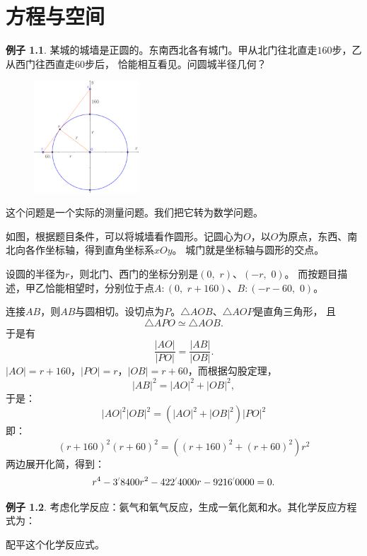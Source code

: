 \documentclass[12pt,UTF8]{ctexbook}
\newcommand{\dlim}[1]{^{\color{gray}\prime}#1}
\theoremstyle{definition}
\newtheorem{ex}{例子}[section]
\theoremstyle{plain}
\begin{document}
\chapter{方程与空间}

\begin{ex}
    某城的城墙是正圆的。东南西北各有城门。甲从北门往北直走$160$步，乙从西门往西直走$60$步后，
    恰能相互看见。问圆城半径几何？ %
\end{ex}

\begin{figure} %
    \vspace{-30pt}
    \flushright
    \includegraphics[width=0.35\textwidth]{tu/整式方程1.png}
\end{figure}

这个问题是一个实际的测量问题。我们把它转为数学问题。

如图，根据题目条件，可以将城墙看作圆形。记圆心为$O$，以$O$为原点，东西、南北向各作坐标轴，得到直角坐标系$xOy$。
城门就是坐标轴与圆形的交点。

设圆的半径为$r$，则北门、西门的坐标分别是$(0, \,\, r)$、$(-r, \,\, 0)$。
而按题目描述，甲乙恰能相望时，分别位于点$A:(0, \,\, r+160)$、$B:(-r-60, \,\, 0)$。

连接$AB$，则$AB$与圆相切。设切点为$P$。$\triangle AOB$、$\triangle AOP$是直角三角形，
且
$$ \triangle APO \simeq \triangle AOB.$$
于是有
$$ \frac{|AO|}{|PO|} = \frac{|AB|}{|OB|}.$$
$|AO| = r+160$，$|PO| = r$，$|OB| = r + 60$，而根据勾股定理，
$$ |AB|^2 = |AO|^2 + |OB|^2,$$
于是：
$$ |AO|^2 |OB|^2 = \left(|AO|^2 + |OB|^2\right) |PO|^2 $$
即：
$$ (r+160)^2 (r+60)^2 = \left((r+160)^2 + (r+60)^2\right) r^2 $$
两边展开化简，得到：
$$ r^4 - 3\dlim{8400} r^2 - 422\dlim{4000} r - 9216\dlim{0000} = 0. $$

\begin{ex}
  考虑化学反应：氨气和氧气反应，生成一氧化氮和水。其化学反应方程式为：

\begin{center}
\end{center}

  配平这个化学反应式。
\end{ex}
\end{document}
